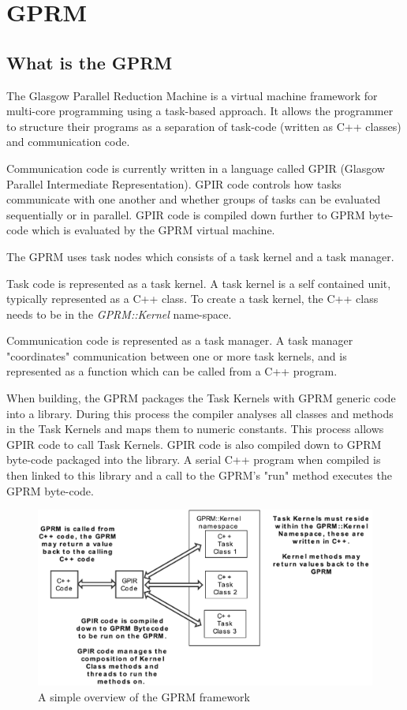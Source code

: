 \section{GPRM}

\subsection{What is the GPRM}

The Glasgow Parallel Reduction Machine\cite{GPRM} is a virtual machine framework for multi-core programming using a task-based approach. It allows the programmer to structure their programs as a separation of task-code (written as C++ classes) and communication code. 

Communication code is currently written in a language called GPIR (Glasgow Parallel Intermediate Representation). 
GPIR code controls how tasks communicate with one another and whether groups
of tasks can be evaluated sequentially or in parallel.  GPIR code is compiled down further to GPRM byte-code which is evaluated by the GPRM virtual machine.

The GPRM uses task nodes which consists of a task kernel and a task manager.

Task code is represented as a task kernel. A task kernel is a self contained unit, typically represented as a C++ class.
To create a task kernel, the C++ class needs to be in the \textit{GPRM::Kernel} name-space.

Communication code is represented as a task manager. A task manager "coordinates" communication between one or more task kernels, and
is represented as a function which can be called from a C++ program.


When building, the GPRM packages the Task Kernels with 
GPRM generic code into a library. During this process the compiler analyses all classes and methods in the
Task Kernels and maps them to numeric constants. This process allows GPIR code to call Task Kernels.
GPIR code is also compiled down to GPRM byte-code packaged into the library. A serial C++ program when compiled is then linked to
this library and a call to the GPRM's "run" method executes the GPRM byte-code. 

\newpage

\begin{figure}[ht]
\begin{center}
\includegraphics[scale=0.7]{graphs/gprm.pdf}
\caption{A simple overview of the GPRM framework}
\end{center}
\end{figure}

